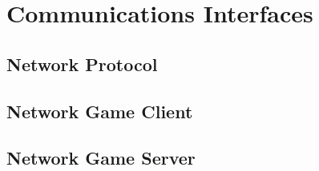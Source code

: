 \section{Communications Interfaces} \label{sec:communicationsinterfaces}


\subsection{Network Protocol}

\subsection{Network Game Client}

\subsection{Network Game Server}

